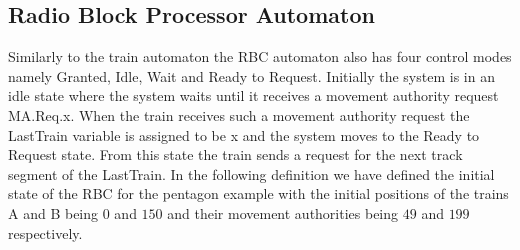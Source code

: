 \subsection{Radio Block Processor Automaton}
Similarly to the train automaton the RBC automaton also has four control modes namely Granted, Idle, Wait and Ready to Request. Initially the system is in an idle state where the system waits until it receives a movement authority request MA.Req.x. When the train receives such a movement authority request the LastTrain variable is assigned to be x and the system moves to the Ready to Request state.  From this state the train sends a request for the next track segment of the LastTrain. In the following definition we have defined the initial state of the RBC for the pentagon example with the initial positions of the trains A and B being $0$ and $150$ and their movement authorities being $49$ and $199$ respectively.
\medskip

